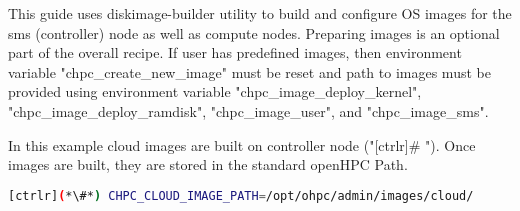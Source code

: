    This guide uses diskimage-builder utility to build and configure OS images 
for the sms (controller) node as well as compute nodes.  Preparing images is 
an optional part of the overall recipe. If user has predefined images, then 
environment variable "chpc\_create\_new\_image" must be reset and 
path to images must be provided using environment variable "chpc\_image\_deploy\_kernel", "chpc\_image\_deploy\_ramdisk",
"chpc\_image\_user", and "chpc\_image\_sms". 

In this example cloud images are built on controller node ("[ctrlr]\# "). Once images are built, they are stored in the standard openHPC Path.

\begin{lstlisting}[language=bash,keywords={}]
[ctrlr](*\#*) CHPC_CLOUD_IMAGE_PATH=/opt/ohpc/admin/images/cloud/
\end{lstlisting}
